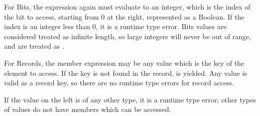 \begin{prooftree}
\end{prooftree}

\begin{prooftree}
\end{prooftree}

For Bits, the expression again must evaluate to an integer, which
is the index of the bit to access, starting from 0 at the right,
represented as a Boolean. If the index is an integer less than 0,
it is a runtime type error. Bits values are considered treated as
infinite length, so large integers will never be out of range, and
are treated as .

\begin{prooftree}
\end{prooftree}

\begin{prooftree}
\end{prooftree}

For Records, the member expression may be any value which is
the key of the element to access. If the key is not found in the
record,  is yielded. Any value is valid as a record key,
so there are no runtime type errors for record access.

\begin{prooftree}
\end{prooftree}

If the value on the left is of any other type, it is a runtime type error;
other types of values do not have members which can be accessed.
